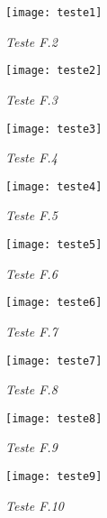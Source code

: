 \documentclass[a4paper,12pt]{report}
\begin{document}
\begin{figure}[h]
	\centering
	\texttt{[image: teste1]}
	\caption[]{\small\sl Teste F.2}
	\captionsetup[figure]{list=no}
\end{figure}

\begin{figure}[h]
	\centering
	\texttt{[image: teste2]}
	\caption[]{\small\sl Teste F.3}
	\captionsetup[figure]{list=no}
\end{figure}

\begin{figure}[h]
	\centering
	\texttt{[image: teste3]}
	\caption[]{\small\sl Teste F.4}
	\captionsetup[figure]{list=no}
\end{figure}

\begin{figure}[h]
	\centering
	\texttt{[image: teste4]}
	\caption[]{\small\sl Teste F.5}
	\captionsetup[figure]{list=no}
\end{figure}

\begin{figure}[h]
	\centering
	\texttt{[image: teste5]}
	\caption[]{\small\sl Teste F.6}
	\captionsetup[figure]{list=no}
\end{figure}

\begin{figure}[h]
	\centering
	\texttt{[image: teste6]}
	\caption[]{\small\sl Teste F.7}
	\captionsetup[figure]{list=no}
\end{figure}

\begin{figure}[h]
	\centering
	\texttt{[image: teste7]}
	\caption[]{\small\sl Teste F.8}
	\captionsetup[figure]{list=no}
\end{figure}

\begin{figure}[h]
	\centering
	\texttt{[image: teste8]}
	\caption[]{\small\sl Teste F.9}
	\captionsetup[figure]{list=no}
\end{figure}

\begin{figure}[h]
	\centering
	\texttt{[image: teste9]}
	\caption[]{\small\sl Teste F.10}
	\captionsetup[figure]{list=no}
\end{figure}
\end{document}
